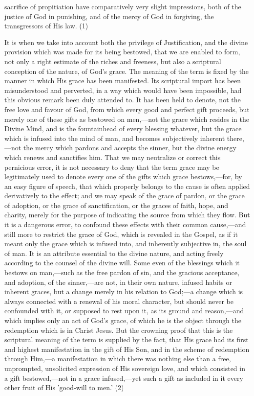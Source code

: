 \documentclass[
]{book}
\begin{document}
sacrifice of propitiation have comparatively very slight impressions, both of the justice of God in punishing, and of the mercy of God in forgiving, the transgressors of His law. (1)

It is when we take into account both the privilege of Justification, and the divine provision which was made for its being bestowed, that we are enabled to form, not only a right estimate of the riches and freeness, but also a scriptural conception of the nature, of God's grace. The meaning of the term is fixed by the manner in which His grace has been manifested. Its scriptural import has been misunderstood and perverted, in a way which would have been impossible, had this obvious remark been duly attended to. It has been held to denote, not the free love and favour of God, from which every good and perfect gift proceeds, but merely one of these gifts as bestowed on men,---not the grace which resides in the Divine Mind, and is the fountainhead of every blessing whatever, but the grace which is infused into the mind of man, and becomes subjectively inherent there,---not the mercy which pardons and accepts the sinner, but the divine energy which renews and sanctifies him. That we may neutralize or correct this pernicious error, it is not necessary to deny that the term grace may be legitimately used to denote every one of the gifts which grace bestows,---for, by an easy figure of speech, that which properly belongs to the cause is often applied derivatively to the effect; and we may speak of the grace of pardon, or the grace of adoption, or the grace of sanctification, or the graces of faith, hope, and charity, merely for the purpose of indicating the source from which they flow. But it is a dangerous error, to confound these effects with their common cause,---and still more to restrict the grace of God, which is revealed in the Gospel, as if it meant only the grace which is infused into, and inherently subjective in, the soul of man. It is an attribute essential to the divine nature, and acting freely according to the counsel of the divine will. Some even of the blessings which it bestows on man,---such as the free pardon of sin, and the gracious acceptance, and adoption, of the sinner,---are not, in their own nature, infused habits or inherent graces, but a change merely in his relation to God;---a change which is always connected with a renewal of his moral character, but should never be confounded with it, or supposed to rest upon it, as its ground and reason,---and which implies only an act of God's grace, of which he is the object through the redemption which is in Christ Jesus. But the crowning proof that this is the scriptural meaning of the term is supplied by the fact, that His grace had its first and highest manifestation in the gift of His Son, and in the scheme of redemption through Him,---a manifestation in which there was nothing else than a free, unprompted, unsolicited expression of His sovereign love, and which consisted in a gift bestowed,---not in a grace infused,---yet such a gift as included in it every other fruit of His 'good-will to men.' (2)
\end{document}

